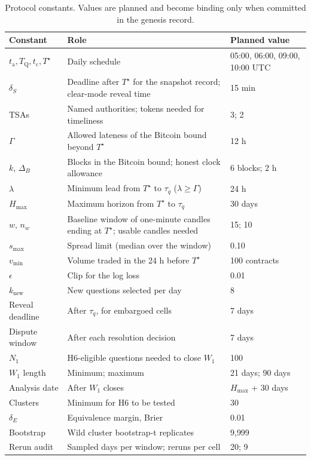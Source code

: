 \documentclass[11pt]{article}
\newcommand{\Ts}{T^{\star}}
\newcommand{\tQ}{T_{\mathrm{Q}}}
\newcommand{\tc}{t_{\mathrm{c}}}
\newcommand{\ta}{t_{\mathrm{a}}}
\begin{document}
\begin{table}[t]
\centering
\small
\begin{tabularx}{\textwidth}{@{}l>{\raggedright\arraybackslash}Xl@{}}
\toprule
Constant & Role & Planned value \\
\midrule
$\ta, \tQ, \tc, \Ts$ & Daily schedule & 05:00, 06:00, 09:00, 10:00 UTC \\
$\delta_S$ & Deadline after $\Ts$ for the snapshot record; clear-mode reveal time & 15 min \\
TSAs & Named authorities; tokens needed for timeliness & 3; 2 \\
$\Gamma$ & Allowed lateness of the Bitcoin bound beyond $\Ts$ & 12 h \\
$k$, $\Delta_B$ & Blocks in the Bitcoin bound; honest clock allowance & 6 blocks; 2 h \\
$\lambda$ & Minimum lead from $\Ts$ to $\tau_q$ ($\lambda \ge \Gamma$) & 24 h \\
$H_{\max}$ & Maximum horizon from $\Ts$ to $\tau_q$ & 30 days \\
$w$, $n_w$ & Baseline window of one-minute candles ending at $\Ts$; usable candles needed & 15; 10 \\
$s_{\max}$ & Spread limit (median over the window) & 0.10 \\
$v_{\min}$ & Volume traded in the 24 h before $\Ts$ & 100 contracts \\
$\epsilon$ & Clip for the log loss & 0.01 \\
$k_{\mathrm{new}}$ & New questions selected per day & 8 \\
Reveal deadline & After $\tau_q$, for embargoed cells & 7 days \\
Dispute window & After each resolution decision & 7 days \\
$N_1$ & H6-eligible questions needed to close $W_1$ & 100 \\
$W_1$ length & Minimum; maximum & 21 days; 90 days \\
Analysis date & After $W_1$ closes & $H_{\max}$ + 30 days \\
Clusters & Minimum for H6 to be tested & 30 \\
$\delta_E$ & Equivalence margin, Brier & 0.01 \\
Bootstrap & Wild cluster bootstrap-t replicates & 9{,}999 \\
Rerun audit & Sampled days per window; reruns per cell & 20; 9 \\
\bottomrule
\end{tabularx}
\caption{Protocol constants. Values are planned and become binding only when committed in the genesis record.}
\label{tab:constants}
\end{table}
\end{document}
